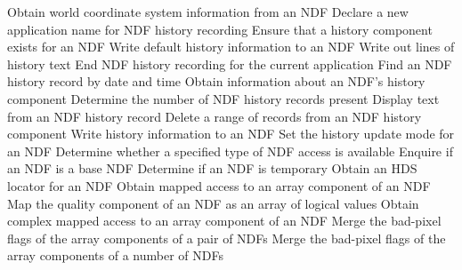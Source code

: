 \begin{latexonly}
            {Obtain world coordinate system information from an NDF}
            {Declare a new application name for NDF history recording}
            {Ensure that a history component exists for an NDF}
            {Write default history information to an NDF}
            {Write out lines of history text}
            {End NDF history recording for the current application}
            {Find an NDF history record by date and time}
            {Obtain information about an NDF's history component}
            {Determine the number of NDF history records present}
            {Display text from an NDF history record}
            {Delete a range of records from an NDF history component}
            {Write history information to an NDF}
            {Set the history update mode for an NDF}
            {Determine whether a specified type of NDF access is available}
            {Enquire if an NDF is a base NDF}
            {Determine if an NDF is temporary}
            {Obtain an HDS locator for an NDF}
            {Obtain mapped access to an array component of an NDF}
            {Map the quality component of an NDF as an array of logical values}
            {Obtain complex mapped access to an array component of an NDF}
            {Merge the bad-pixel flags of the array components of a pair of NDFs}
            {Merge the bad-pixel flags of the array components of a number of NDFs}

\end{latexonly}
